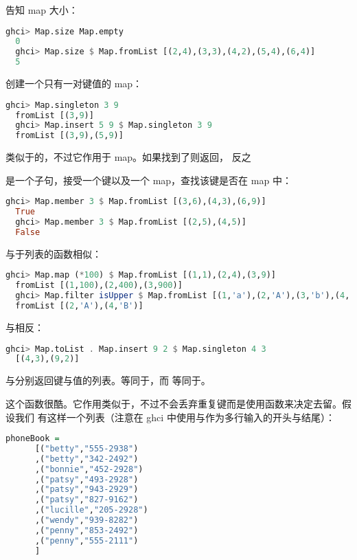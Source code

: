\documentclass[./main.tex]{subfiles}
\begin{document}
告知 map 大小：

\begin{lstlisting}[language=Haskell]
  ghci> Map.size Map.empty
  0
  ghci> Map.size $ Map.fromList [(2,4),(3,3),(4,2),(5,4),(6,4)]
  5
\end{lstlisting}

创建一个只有一对键值的 map：

\begin{lstlisting}[language=Haskell]
  ghci> Map.singleton 3 9
  fromList [(3,9)]
  ghci> Map.insert 5 9 $ Map.singleton 3 9
  fromList [(3,9),(5,9)]
\end{lstlisting}

类似于的，不过它作用于 map。如果找到了则返回，
反之

是一个子句，接受一个键以及一个 map，查找该键是否在 map 中：

\begin{lstlisting}[language=Haskell]
  ghci> Map.member 3 $ Map.fromList [(3,6),(4,3),(6,9)]
  True
  ghci> Map.member 3 $ Map.fromList [(2,5),(4,5)]
  False
\end{lstlisting}

与于列表的函数相似：

\begin{lstlisting}[language=Haskell]
  ghci> Map.map (*100) $ Map.fromList [(1,1),(2,4),(3,9)]
  fromList [(1,100),(2,400),(3,900)]
  ghci> Map.filter isUpper $ Map.fromList [(1,'a'),(2,'A'),(3,'b'),(4,'B')]
  fromList [(2,'A'),(4,'B')]
\end{lstlisting}

与相反：

\begin{lstlisting}[language=Haskell]
  ghci> Map.toList . Map.insert 9 2 $ Map.singleton 4 3
  [(4,3),(9,2)]
\end{lstlisting}

与分别返回键与值的列表。等同于，而
等同于。

这个函数很酷。它作用类似于，不过不会丢弃重复键而是使用函数来决定去留。假设我们
有这样一个列表（注意在 ghci 中使用\acode{:\{}与\acode{:\}}作为多行输入的开头与结尾）：

\begin{lstlisting}[language=Haskell]
  phoneBook =
      [("betty","555-2938")
      ,("betty","342-2492")
      ,("bonnie","452-2928")
      ,("patsy","493-2928")
      ,("patsy","943-2929")
      ,("patsy","827-9162")
      ,("lucille","205-2928")
      ,("wendy","939-8282")
      ,("penny","853-2492")
      ,("penny","555-2111")
      ]
\end{lstlisting}
\end{document}
